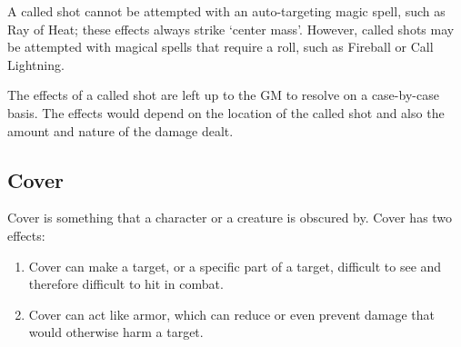 \documentclass[twoside]{book}
\begin{document}
    {  
      A called shot cannot be attempted with an
               auto-targeting magic spell, such as Ray of Heat; these
               effects always strike `center mass'. However,
               called shots may be attempted with magical spells that
               require a roll, such as Fireball or Call Lightning.
               
    }
  
    {  
      The effects of a called shot are left up to the GM
               to resolve on a case-by-case basis. The effects would
               depend on the location of the called shot and also the
               amount and nature of the damage dealt. 
    }
  
  

  

  
  

  

  
    

\subsection{Cover}
    
    {  
      Cover is something that a character or a creature
               is obscured by. Cover has two effects: 
    }
  
\begin{enumerate}
      
  \item 
                
    {  
      Cover can make a target, or a specific part of a
                 target, difficult to see and therefore difficult to hit
                 in combat. 
    }
  
              
  \item 
                
    {  
     Cover can act like armor, which can reduce or even
                 prevent damage that would otherwise harm a target.
                 
    }
  
              
\end{enumerate}
  
\end{document}
